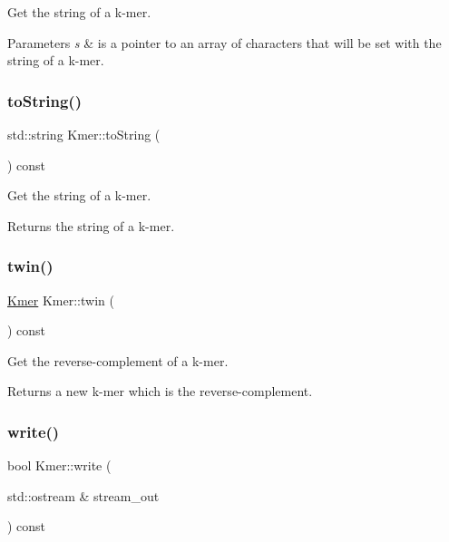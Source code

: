Get the string of a k-\/mer. 


\begin{DoxyParams}{Parameters}
{\em s} & is a pointer to an array of characters that will be set with the string of a k-\/mer. \\
\hline
\end{DoxyParams}
\mbox{\label{classKmer_ae394adf5587405c5204a07df6b95cebb}} 
\subsubsection{\texorpdfstring{to\+String()}{toString()}\hspace{0.1cm}{\footnotesize\ttfamily [2/2]}}
{\footnotesize\ttfamily std\+::string Kmer\+::to\+String (\begin{DoxyParamCaption}{ }\end{DoxyParamCaption}) const}



Get the string of a k-\/mer. 

\begin{DoxyReturn}{Returns}
the string of a k-\/mer. 
\end{DoxyReturn}
\mbox{\label{classKmer_a82924425f6f6bd3e1d746f600936781c}} 
\subsubsection{\texorpdfstring{twin()}{twin()}}
{\footnotesize\ttfamily \hyperlink{classKmer}{Kmer} Kmer\+::twin (\begin{DoxyParamCaption}{ }\end{DoxyParamCaption}) const}



Get the reverse-\/complement of a k-\/mer. 

\begin{DoxyReturn}{Returns}
a new k-\/mer which is the reverse-\/complement. 
\end{DoxyReturn}
\mbox{\label{classKmer_afeabfe32515eb278bdab47d5434e8a92}} 
\subsubsection{\texorpdfstring{write()}{write()}}
{\footnotesize\ttfamily bool Kmer\+::write (\begin{DoxyParamCaption}\item[{std\+::ostream \&}]{stream\+\_\+out }\end{DoxyParamCaption}) const}



